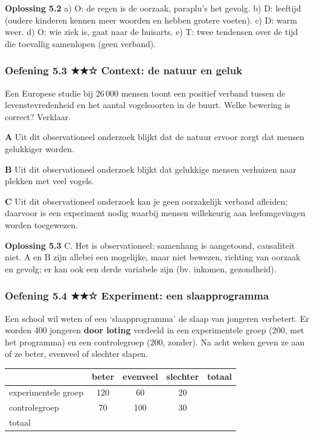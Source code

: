 \begin{oplossing}
\textbf{Oplossing 5.2} \quad a) O: de regen is de oorzaak, paraplu’s het gevolg. b) D: leeftijd (oudere kinderen kennen meer woorden en hebben grotere voeten). c) D: warm weer. d) O: wie ziek is, gaat naar de huisarts. e) T: twee tendensen over de tijd die toevallig samenlopen (geen verband).
\end{oplossing}

\subsubsection*{Oefening 5.3 \quad ★★☆ \quad Context: de natuur en geluk}

Een Europese studie bij 26\,000 mensen toont een positief verband tussen de levenstevredenheid en het aantal vogelsoorten in de buurt. Welke bewering is correct? Verklaar.

\textbf{A} Uit dit observationeel onderzoek blijkt dat de natuur ervoor zorgt dat mensen gelukkiger worden.

\textbf{B} Uit dit observationeel onderzoek blijkt dat gelukkige mensen verhuizen naar plekken met veel vogels.

\textbf{C} Uit dit observationeel onderzoek kan je geen oorzakelijk verband afleiden; daarvoor is een experiment nodig waarbij mensen willekeurig aan leefomgevingen worden toegewezen.

\lijn

\begin{oplossing}
\textbf{Oplossing 5.3} \quad C. Het is observationeel: samenhang is aangetoond, causaliteit niet. A en B zijn allebei een mogelijke, maar niet bewezen, richting van oorzaak en gevolg; er kan ook een derde variabele zijn (bv. inkomen, gezondheid).
\end{oplossing}

\subsubsection*{Oefening 5.4 \quad ★★☆ \quad Experiment: een slaapprogramma}

Een school wil weten of een ‘slaapprogramma’ de slaap van jongeren verbetert. Er worden 400 jongeren \textbf{door loting} verdeeld in een experimentele groep (200, met het programma) en een controlegroep (200, zonder). Na acht weken geven ze aan of ze beter, evenveel of slechter slapen.

\begin{tabular}{lcccc}
\hline
 & beter & evenveel & slechter & totaal \\
\hline
experimentele groep & 120 & 60 & 20 & \\
controlegroep & 70 & 100 & 30 & \\
totaal & & & & \\
\hline
\end{tabular}

